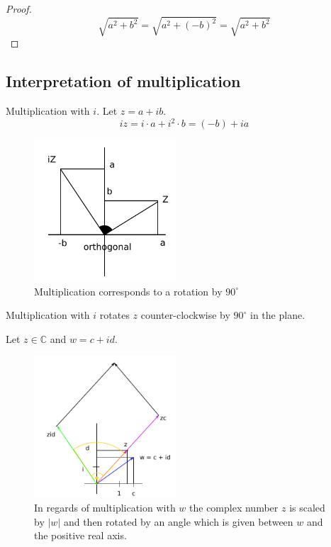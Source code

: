 \documentclass[a4paper,landscape,twocolumn]{article}
\theoremstyle{definition}
\newcommand\abs[1]{\left|#1\right|}
\begin{document}
\begin{proof}
  \[ \sqrt{a^2 + b^2} = \sqrt{a^2 + (-b)^2} = \sqrt{a^2 + b^2} \]
\end{proof}

\subsection{Interpretation of multiplication}
%
Multiplication with $i$. Let $z = a + ib$.
\[ iz = i\cdot a + i^2 \cdot b = (-b) + i a \]

\begin{figure}[!h]
  \begin{center}
    \includegraphics[width=200px]{img/complex_number_multiplication.pdf}
    \caption{Multiplication corresponds to a rotation by $90^\circ$}
  \end{center}
\end{figure}

Multiplication with $i$ rotates $z$ counter-clockwise by $90^\circ$
in the plane.

Let $z \in \mathbb C$ and $w = c + id$.

\begin{figure}[!h]
  \begin{center}
    \includegraphics[width=200px]{img/complex_numbers_multiplication_with_b.pdf}
    \caption{
      In regards of multiplication with $w$ the complex number $z$ is scaled by $\abs{w}$
      and then rotated by an angle which is given between $w$ and the positive real axis.
    }
  \end{center}
\end{figure}
\end{document}

